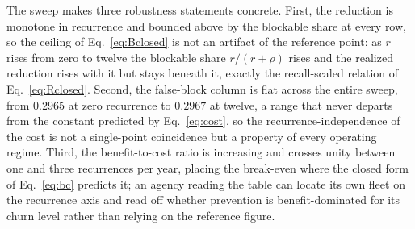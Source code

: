 \documentclass[journal]{IEEEtran}
\begin{document}
\begin{table}[t]
\centering
\caption{Full per-recurrence sensitivity sweep (mean over 25 seeds, frozen seeds 900 to 924).
Recurrence is per endpoint per year; reduction $R$ is the fractional exposure decrease of
prevention over detection; exposure saved is in Criminal Justice Information control-days per
fleet-year; false blocks are per endpoint-month; benefit-to-cost is the dimensionless ratio of
saved exposure to total false-block cost.}
\label{tab:sweep}
\footnotesize
\setlength{\tabcolsep}{4pt}
\end{table}

The sweep makes three robustness statements concrete. First, the reduction is monotone in
recurrence and bounded above by the blockable share at every row, so the ceiling of
Eq.~\eqref{eq:Bclosed} is not an artifact of the reference point: as $r$ rises from zero to twelve
the blockable share $r/(r+\rho)$ rises and the realized reduction rises with it but stays beneath
it, exactly the recall-scaled relation of Eq.~\eqref{eq:Rclosed}. Second, the false-block column is
flat across the entire sweep, from $0.2965$ at zero recurrence to $0.2967$ at twelve, a range that
never departs from the constant predicted by Eq.~\eqref{eq:cost}, so the recurrence-independence of
the cost is not a single-point coincidence but a property of every operating regime. Third, the
benefit-to-cost ratio is increasing and crosses unity between one and three recurrences per year,
placing the break-even where the closed form of Eq.~\eqref{eq:bc} predicts it; an agency reading
the table can locate its own fleet on the recurrence axis and read off whether prevention is
benefit-dominated for its churn level rather than relying on the reference figure.
\end{document}
